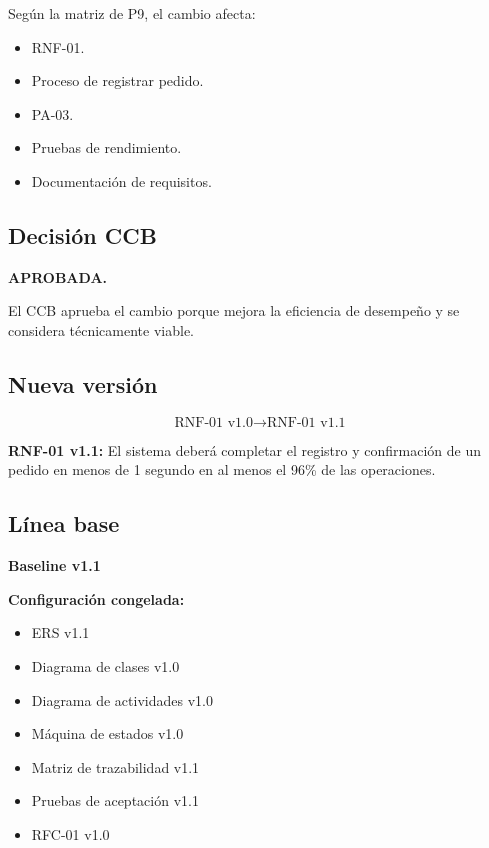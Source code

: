 \documentclass[12pt]{article}
\begin{document}
Según la matriz de P9, el cambio afecta:

\begin{itemize}
    \item RNF-01.
    \item Proceso de registrar pedido.
    \item PA-03.
    \item Pruebas de rendimiento.
    \item Documentación de requisitos.
\end{itemize}

\subsection*{Decisión CCB}

\textbf{APROBADA.}

El CCB aprueba el cambio porque mejora la eficiencia de desempeño
y se considera técnicamente viable.

\subsection*{Nueva versión}

\[
\text{RNF-01 v1.0} \rightarrow \text{RNF-01 v1.1}
\]

\textbf{RNF-01 v1.1:} El sistema deberá completar el registro y
confirmación de un pedido en menos de 1 segundo en al menos el
96\% de las operaciones.

\subsection*{Línea base}

\textbf{Baseline v1.1}

\textbf{Configuración congelada:}

\begin{itemize}
    \item ERS v1.1
    \item Diagrama de clases v1.0
    \item Diagrama de actividades v1.0
    \item Máquina de estados v1.0
    \item Matriz de trazabilidad v1.1
    \item Pruebas de aceptación v1.1
    \item RFC-01 v1.0
\end{itemize}
\end{document}
